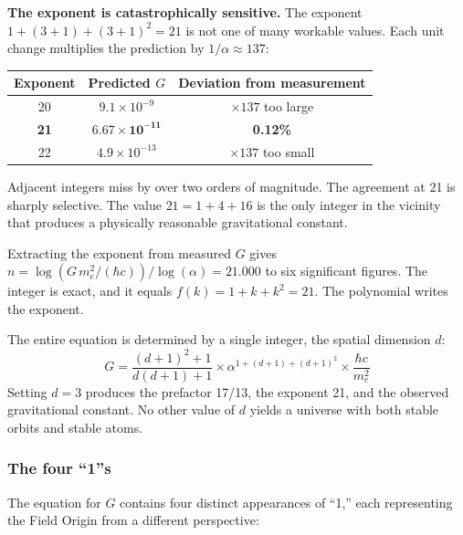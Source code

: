 \documentclass[aps,prd,preprint,superscriptaddress,showpacs,preprintnumbers,amsmath,amssymb,nofootinbib]{revtex4-2}
\begin{document}
\textbf{The exponent is catastrophically sensitive.} The exponent $1 + (3{+}1) + (3{+}1)^2 = 21$ is not one of many workable values. Each unit change multiplies the prediction by $1/\alpha \approx 137$:

\begin{center}
\begin{tabular}{ccc}
\toprule
\textbf{Exponent} & \textbf{Predicted $G$} & \textbf{Deviation from measurement} \\
\midrule
20 & $9.1 \times 10^{-9}$ & $\times 137$ too large \\
\textbf{21} & $\bm{6.67 \times 10^{-11}}$ & \textbf{0.12\%} \\
22 & $4.9 \times 10^{-13}$ & $\times 137$ too small \\
\bottomrule
\end{tabular}
\end{center}

Adjacent integers miss by over two orders of magnitude. The agreement at 21 is sharply selective. The value $21 = 1 + 4 + 16$ is the only integer in the vicinity that produces a physically reasonable gravitational constant.

Extracting the exponent from measured $G$ gives $n = \log(G\,m_e^2/(\hbar c)) / \log(\alpha) = 21.000$ to six significant figures. The integer is exact, and it equals $f(k) = 1 + k + k^2 = 21$. The polynomial writes the exponent.

The entire equation is determined by a single integer, the spatial dimension $d$:
\begin{equation}
G = \frac{(d+1)^2 + 1}{d(d+1) + 1} \times \alpha^{1 + (d+1) + (d+1)^2} \times \frac{\hbar c}{m_e^2}
\label{eq:G-general-d}
\end{equation}
Setting $d = 3$ produces the prefactor 17/13, the exponent 21, and the observed gravitational constant. No other value of $d$ yields a universe with both stable orbits and stable atoms.

\subsubsection*{The four ``1''s}

The equation for $G$ contains four distinct appearances of ``1,'' each representing the Field Origin from a different perspective:
\end{document}
